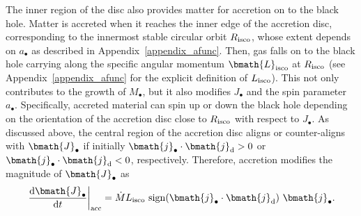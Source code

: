 \documentclass[a4paper,fleqn,usenatbib]{mnras}
\begin{document}
The inner region of the disc also provides matter for accretion on to the black hole.
Matter is accreted when it reaches the inner edge of the accretion disc, corresponding to the innermost stable circular orbit $R_{\rm isco}$, whose extent depends on $a_{\bullet}$ as described in Appendix~\ref{appendix_afunc}.
Then, gas falls on to the black hole carrying along the specific angular momentum $\bmath{L}_{\rm isco}$ at $R_{\rm isco}$ (see Appendix~\ref{appendix_afunc} for the explicit definition of $L_{\rm isco}$).
This not only contributes to the growth of $M_{\bullet}$, but it also modifies $J_{\bullet}$ and the spin parameter $a_{\bullet}$.
Specifically, accreted material can spin up or down the black hole depending on the orientation of the accretion disc close to $R_{\rm isco}$ with respect to $J_{\bullet}$.
As discussed above, the central region of the accretion disc aligns or counter-aligns with $\bmath{J}_{\bullet}$ if initially $\bmath{j}_{\bullet} \cdot \bmath{j}_{\rm d} > 0$ or $\bmath{j}_{\bullet} \cdot \bmath{j}_{\rm d} < 0$, respectively.
Therefore, accretion modifies the magnitude of $\bmath{J}_{\bullet}$ as 
\begin{equation}\label{eq_torque_acc}
\left. \frac{{\rm d}\bmath{J}_{\bullet}}{{\rm d}t} \right|_{\rm acc} = \dot{M} L_{\rm isco}~{\rm sign}(\bmath{j}_{\bullet} \cdot \bmath{j}_{\rm d})~\bmath{j}_{\bullet}.
\end{equation}
\end{document}
